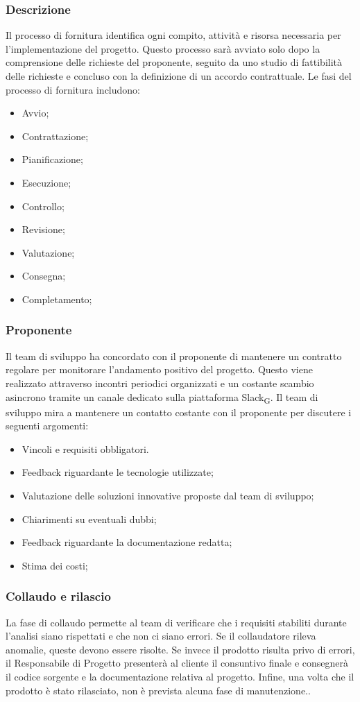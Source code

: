 \documentclass{article}
\begin{document}
\subsubsection{Descrizione}
Il processo di fornitura identifica ogni compito, attività e risorsa necessaria per l'implementazione del progetto. Questo processo sarà avviato solo dopo la comprensione delle richieste del proponente, seguito da uno studio di fattibilità delle richieste e concluso con la definizione di un accordo contrattuale. Le fasi del processo di fornitura includono:
\begin{itemize}
    \item Avvio;
    \item Contrattazione;
    \item Pianificazione;
    \item Esecuzione;
    \item Controllo;
    \item Revisione;
    \item Valutazione;
    \item Consegna;
    \item Completamento;
\end{itemize}

\subsubsection{Proponente}
Il team di sviluppo ha concordato con il proponente di mantenere un contratto regolare per monitorare l'andamento positivo del progetto. Questo viene realizzato attraverso incontri periodici organizzati e un costante scambio asincrono tramite un canale dedicato sulla piattaforma Slack\textsubscript{G}. Il team di sviluppo mira a mantenere un contatto costante con il proponente per discutere i seguenti argomenti:
\begin{itemize}
    \item Vincoli e requisiti obbligatori.
    \item Feedback riguardante le tecnologie utilizzate;
    \item Valutazione delle soluzioni innovative proposte dal team di sviluppo;
    \item Chiarimenti su eventuali dubbi;
    \item Feedback riguardante la documentazione redatta;
    \item Stima dei costi;
\end{itemize}

\subsubsection{Collaudo e rilascio}
La fase di collaudo permette al team di verificare che i requisiti stabiliti durante l'analisi siano rispettati e che non ci siano errori. Se il collaudatore rileva anomalie, queste devono essere risolte. Se invece il prodotto risulta privo di errori, il Responsabile di Progetto presenterà al cliente il consuntivo finale e consegnerà il codice sorgente e la documentazione relativa al progetto. Infine, una volta che il prodotto è stato rilasciato, non è prevista alcuna fase di manutenzione..
\end{document}
